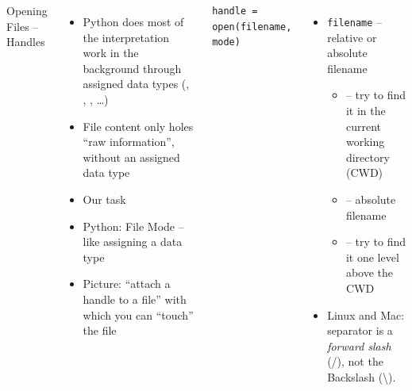 \begin{frame}[fragile]
%
\begin{columns}[T]
\begin{Large}
	{Opening Files -- Handles}
	\vspace{6pt}
\end{Large}
\begin{itemize}
\item Python does most of the interpretation work in the background through assigned data types (, , , \ldots)
\item File content only holes \enquote{raw information}, without an assigned data type
\item[\Thus] Our task
\item Python: File Mode -- like assigning a data type
\item Picture: \enquote{attach a handle to a file} with which you can \enquote{touch} the file
\end{itemize}
%
\begin{codebox}
\begin{verbatim}
handle = open(filename, mode)
\end{verbatim}
\end{codebox}
%
\begin{itemize}
\item \texttt{filename} -- relative or absolute filename
	\begin{itemize}
	\item {} -- try to find it in the current working directory (CWD)
	\item {} -- absolute filename
	\item {} -- try to find it one level above the CWD
	\end{itemize}
\item Linux and Mac: separator is a \emph{forward slash} (/), not the Backslash (\textbackslash).
\end{itemize}
\end{columns}
%
\end{frame}


